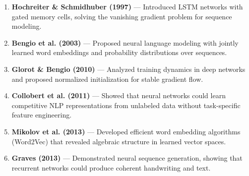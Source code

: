 \begin{enumerate}
\item \textbf{Hochreiter \& Schmidhuber (1997)} --- Introduced LSTM networks with gated memory cells, solving the vanishing gradient problem for sequence modeling.

\item \textbf{Bengio et al. (2003)} --- Proposed neural language modeling with jointly learned word embeddings and probability distributions over sequences.

\item \textbf{Glorot \& Bengio (2010)} --- Analyzed training dynamics in deep networks and proposed normalized initialization for stable gradient flow.

\item \textbf{Collobert et al. (2011)} --- Showed that neural networks could learn competitive NLP representations from unlabeled data without task-specific feature engineering.

\item \textbf{Mikolov et al. (2013)} --- Developed efficient word embedding algorithms (Word2Vec) that revealed algebraic structure in learned vector spaces.

\item \textbf{Graves (2013)} --- Demonstrated neural sequence generation, showing that recurrent networks could produce coherent handwriting and text.
\end{enumerate}
